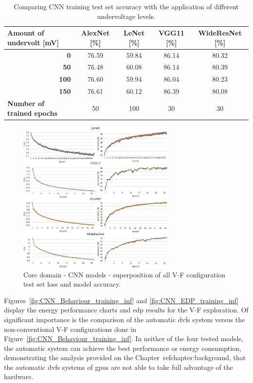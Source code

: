 \begin{table}[htb]
    \centering
   
    \label{tab:trainingAcc}
    \begin{tabular}{rcccc}
        \multicolumn{1}{l}{{\textbf{Amount of undervolt {[}mV{]}}}} &
          \textbf{AlexNet {[}\%{]}} &
          \textbf{LeNet {[}\%{]}} &
          \textbf{VGG11 {[}\%{]}} &
          \textbf{WideResNet {[}\%{]}} \\ \hline
        \textbf{0}   & 76.59 & 59.84 & 86.14 & 80.32 \\
        \textbf{50}  & 76.48 & 60.08 & 86.14 & 80.39 \\
        \textbf{100} & 76.60 & 59.94 & 86.04 & 80.23 \\
        \textbf{150} & 76.61 & 60.12 & 86.39 & 80.08 \\ \hline
        \multicolumn{1}{l}{{\textbf{Number of trained epochs}}} &
          50 &
          100 &
          30 &
          30
    \end{tabular}%
     \caption{Comparing CNN training test set accuracy with the application of different undervoltage levels.}
\end{table}

\begin{figure}[htb]
    \centering
        \includegraphics[width=0.7\textwidth]{Figures/Application To Deep Learning/CNN_loss_acc.pdf}
        \caption{Core domain - CNN models - superposition of all V-F configuration test set loss and model accuracy.}
    \label{fig:CNN_loss}
\end{figure}

Figures~\ref{fig:CNN_Behaviour_training_inf} and \ref{fig:CNN_EDP_training_inf} display the energy performance charts and \acrshort{edp} results for the V-F exploration. Of significant importance is the comparison of the automatic  \acrshort{dvfs} system versus the non-conventional V-F configurations done in Figure~\ref{fig:CNN_Behaviour_training_inf}. In neither of the four tested models, the automatic system can achieve the best performance or energy consumption, demonstrating the analysis provided on the Chapter~ref{chapter:background}, that the automatic \acrshort{dvfs} systems of \acrshort{gpu}s are not able to take full advantage of the hardware. 

